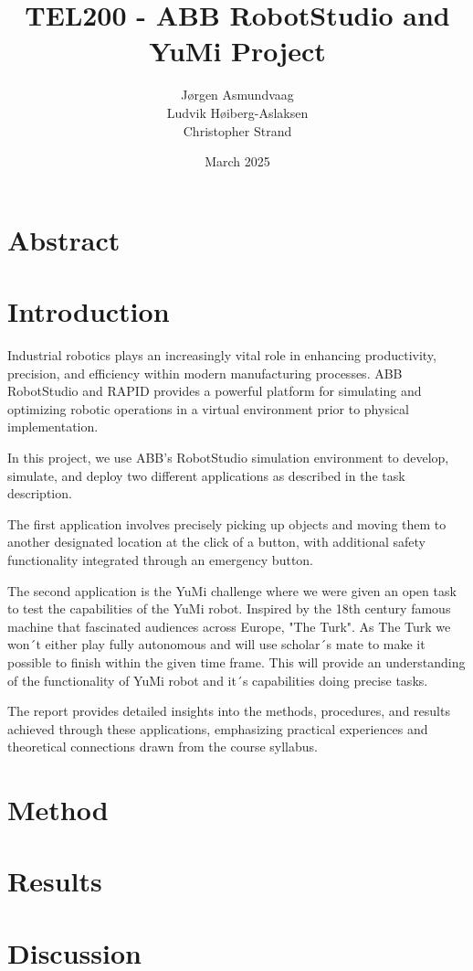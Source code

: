 \documentclass[a4paper,12pt]{article}
\title{TEL200 - ABB RobotStudio and YuMi Project}
\author{J\o rgen Asmundvaag \\ Ludvik H\o iberg-Aslaksen \\ Christopher Strand}
\date{March 2025}
\begin{document}
\maketitle

\newpage
\section{Abstract}
\section{Introduction}
Industrial robotics plays an increasingly vital role in enhancing productivity, precision, and efficiency within modern manufacturing processes. ABB RobotStudio and RAPID provides a powerful platform for simulating and optimizing robotic operations in a virtual environment prior to physical implementation.

In this project, we use ABB's RobotStudio simulation environment to develop, simulate, and deploy two different applications as described in the task description. 

The first application involves precisely picking up objects and moving them to another designated location at the click of a button, with additional safety functionality integrated through an emergency button.

The second application is the YuMi challenge where we were given an open task to test the capabilities of the YuMi robot. Inspired by the 18th century famous machine that fascinated audiences across Europe, "The Turk". As The Turk we won´t either play fully autonomous and will use scholar´s mate to make it possible to finish within the given time frame. This  will provide an understanding of the functionality of YuMi robot and it´s capabilities doing precise tasks.

The report provides detailed insights into the methods, procedures, and results achieved through these applications, emphasizing practical experiences and theoretical connections drawn from the course syllabus.

\section{Method}
\section{Results}
\section{Discussion}
\end{document}
